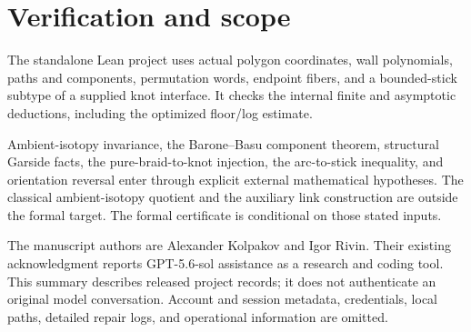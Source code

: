 \documentclass[11pt]{article}
\begin{document}
\section*{Verification and scope}
The standalone Lean project uses actual polygon coordinates, wall
polynomials, paths and components, permutation words, endpoint fibers, and
a bounded-stick subtype of a supplied knot interface. It checks the internal
finite and asymptotic deductions, including the optimized floor/log estimate.

Ambient-isotopy invariance, the Barone--Basu component theorem, structural
Garside facts, the pure-braid-to-knot injection, the arc-to-stick inequality,
and orientation reversal enter through explicit external mathematical
hypotheses. The classical ambient-isotopy quotient and the auxiliary link
construction are outside the formal target. The formal certificate is
conditional on those stated inputs.

The manuscript authors are Alexander Kolpakov and Igor Rivin. Their existing
acknowledgment reports GPT-5.6-sol assistance as a research and coding tool.
This summary describes released project records; it does not authenticate
an original model conversation. Account and session metadata, credentials,
local paths, detailed repair logs, and operational information are omitted.
\end{document}
